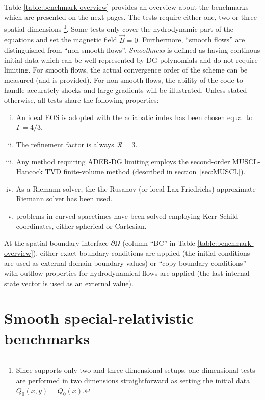 Table \ref{table:benchmark-overview} provides an overview about the
benchmarks which are presented on the next pages. The tests require either
one, two or three spatial dimensions \footnote{
  Since  supports only two and three dimensional setups,
  one dimensional tests are performed in two dimensions straightforward
  as setting the initial data $Q_0(x,y) = Q_0(x)$.
}. Some tests only cover the hydrodynamic part of the equations and set 
the magnetic field $\vec B=0$. Furthermore, ``smooth flows'' are
distinguished from ``non-smooth flows''. \emph{Smoothness} is defined
as having continous initial data which can be well-represented by DG
polynomials and do not require limiting. For smooth flows, the actual
convergence order of the scheme can be measured (and is provided). For
non-smooth flows, the ability of the code to handle accurately shocks
and large gradients will be illustrated.
%
Unless stated otherwise, all tests share the following properties:
\begin{enumerate}[(i)]
	\item An ideal EOS is adopted with the adiabatic index has been chosen
	   equal to $\Gamma=4/3$.
	\item The refinement factor is always $\mathcal{R}=3$.
	\item Any method requiring ADER-DG limiting employs the second-order
	  MUSCL-Hancock TVD finite-volume method (described in section~\ref{sec:MUSCL}).
	\item As a Riemann solver, the
      the Rusanov (or local Lax-Friedrichs) approximate Riemann solver has been used.
    \item problems in curved spacetimes have been solved employing
      Kerr-Schild coordinates, either spherical or Cartesian.
\end{enumerate}
%
At the spatial boundary interface $\partial \Omega$
(column ``BC'' in Table \ref{table:benchmark-overview}), either exact boundary
conditions are applied (\ie the initial conditions are used as external
domain boundary values) or ``copy boundary conditions'' with outflow
properties for hydrodynamical flows are applied (\ie the last internal
state vector is used as an external value).


\section{Smooth special-relativistic benchmarks}
\label{sec:smooth}

